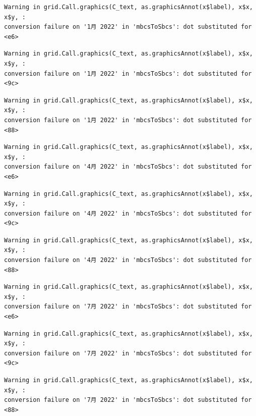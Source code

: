 \documentclass[
  letterpaper,
  DIV=11,
  numbers=noendperiod]{scrartcl}
\begin{document}
\begin{verbatim}
Warning in grid.Call.graphics(C_text, as.graphicsAnnot(x$label), x$x, x$y, :
conversion failure on '1月 2022' in 'mbcsToSbcs': dot substituted for <e6>
\end{verbatim}

\begin{verbatim}
Warning in grid.Call.graphics(C_text, as.graphicsAnnot(x$label), x$x, x$y, :
conversion failure on '1月 2022' in 'mbcsToSbcs': dot substituted for <9c>
\end{verbatim}

\begin{verbatim}
Warning in grid.Call.graphics(C_text, as.graphicsAnnot(x$label), x$x, x$y, :
conversion failure on '1月 2022' in 'mbcsToSbcs': dot substituted for <88>
\end{verbatim}

\begin{verbatim}
Warning in grid.Call.graphics(C_text, as.graphicsAnnot(x$label), x$x, x$y, :
conversion failure on '4月 2022' in 'mbcsToSbcs': dot substituted for <e6>
\end{verbatim}

\begin{verbatim}
Warning in grid.Call.graphics(C_text, as.graphicsAnnot(x$label), x$x, x$y, :
conversion failure on '4月 2022' in 'mbcsToSbcs': dot substituted for <9c>
\end{verbatim}

\begin{verbatim}
Warning in grid.Call.graphics(C_text, as.graphicsAnnot(x$label), x$x, x$y, :
conversion failure on '4月 2022' in 'mbcsToSbcs': dot substituted for <88>
\end{verbatim}

\begin{verbatim}
Warning in grid.Call.graphics(C_text, as.graphicsAnnot(x$label), x$x, x$y, :
conversion failure on '7月 2022' in 'mbcsToSbcs': dot substituted for <e6>
\end{verbatim}

\begin{verbatim}
Warning in grid.Call.graphics(C_text, as.graphicsAnnot(x$label), x$x, x$y, :
conversion failure on '7月 2022' in 'mbcsToSbcs': dot substituted for <9c>
\end{verbatim}

\begin{verbatim}
Warning in grid.Call.graphics(C_text, as.graphicsAnnot(x$label), x$x, x$y, :
conversion failure on '7月 2022' in 'mbcsToSbcs': dot substituted for <88>
\end{verbatim}
\end{document}
